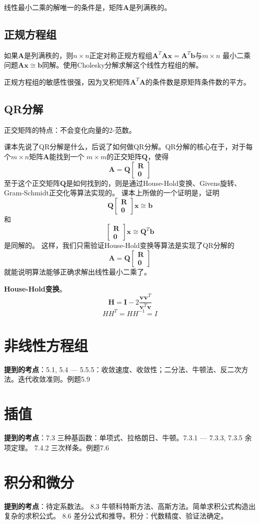 \documentclass[14pt, letterpaper, UTF8, fontset=windowsnew, heading=true]{article}
\begin{document}
\par
线性最小二乘的解唯一的条件是，矩阵$\bm{A}$是列满秩的。

\subsection{正规方程组}

如果$\bm{A}$是列满秩的，则$n\times n$正定对称正规方程组$\bm{A}^T\bm{Ax}=\bm{A}^T\bm{b}$与$m\times n$
最小二乘问题$\bm{Ax}\cong\bm{b}$同解。使用Cholesky分解求解这个线性方程组的解。

\par
正规方程组的敏感性很强，因为叉积矩阵$\bm{A}^T\bm{A}$的条件数是原矩阵条件数的平方。

\subsection{QR分解}
正交矩阵的特点：不会变化向量的2-范数。
\par
课本先说了QR分解是什么，后说了如何做QR分解。QR分解的核心在于，对于每个$m\times n$矩阵$\bm{A}$能找到一个
$m\times m$的正交矩阵$\bm{Q}$，使得
$$\bm{A}=\bm{Q}\begin{bmatrix}\bm{R}\\ \bm{0}\end{bmatrix}$$
至于这个正交矩阵$\bm{Q}$是如何找到的，则是通过House-Hold变换、Givens旋转、Gram-Schmidt正交化等算法实现的。
课本上所做的一个证明是，证明
$$\bm{Q}\begin{bmatrix}\bm{R}\\ \bm{0}\end{bmatrix}\bm{x}\cong\bm{b}$$和
$$\begin{bmatrix}\bm{R}\\ \bm{0}\end{bmatrix}\bm{x}\cong\bm{Q}^T\bm{b}$$
是同解的。
这样，我们只需验证House-Hold变换等算法是实现了QR分解的
$$\bm{A}=\bm{Q}\begin{bmatrix}\bm{R}\\ \bm{0}\end{bmatrix}$$
就能说明算法能够正确求解出线性最小二乘了。

\textbf{House-Hold变换}。
$$\bm{H} = \bm{I} - 2\frac{\bm{vv}^T}{\bm{v}^T\bm{v}}$$
$$HH^T=HH^{-1}=I$$

\section{非线性方程组}

\textbf{提到的考点}：5.1, 5.4 --- 5.5.5：收敛速度、收敛性；二分法、牛顿法、反二次方法。迭代收敛准则。例题5.9

\section{插值}

\textbf{提到的考点}：7.3 三种基函数：单项式、拉格朗日、牛顿。7.3.1 --- 7.3.3, 7.3.5 余项定理。
7.4.2 三次样条。例题7.6

\section{积分和微分}

\textbf{提到的考点}：待定系数法。 8.3 牛顿科特斯方法、高斯方法。简单求积公式构造出复杂的求积公式。
8.6 差分公式和推导。积分：代数精度、验证法确定。
	
\end{document}
